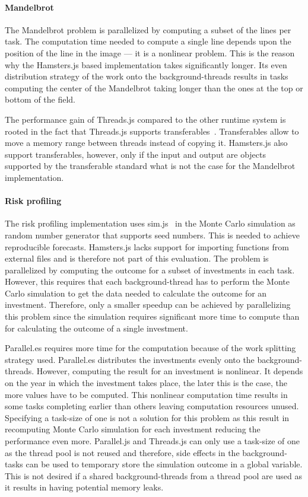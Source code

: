 \paragraph{Mandelbrot}
The Mandelbrot problem is parallelized by computing a subset of the lines per task. The computation time needed to compute a single line depends upon the position of the line in the image --- it is a nonlinear problem. This is the reason why the Hamsters.js based implementation takes significantly longer. Its even distribution strategy of the work onto the background-threads results in tasks computing the center of the Mandelbrot taking longer than the ones at the top or bottom of the field. 

The performance gain of Threads.js compared to the other runtime system is rooted in the fact that Threads.js supports transferables~\cite[Section 2.7.4]{w3cHtml5}. Transferables allow to move a memory range between threads instead of copying it. Hamsters.js also support transferables, however, only if the input and output are objects supported by the transferable standard what is not the case for the Mandelbrot implementation.

\paragraph{Risk profiling}
The risk profiling implementation uses sim.js~\cite{simjs} in the Monte Carlo simulation as random number generator that supports seed numbers. This is needed to achieve reproducible forecasts. Hamsters.js lacks support for importing functions from external files and is therefore not part of this evaluation. The problem is parallelized by computing the outcome for a subset of investments in each task. However, this requires that each background-thread has to perform the Monte Carlo simulation to get the data needed to calculate the outcome for an investment. Therefore, only a smaller speedup can be achieved by parallelizing this problem since the simulation requires significant more time to compute than for calculating the outcome of a single investment. 

Parallel.es requires more time for the computation because of the work splitting strategy used. Parallel.es distributes the investments evenly onto the background-threads. However, computing the result for an investment is nonlinear. It depends on the year in which the investment takes place, the later this is the case, the more values have to be computed. This nonlinear computation time results in some tasks completing earlier than others leaving computation resources unused. Specifying a task-size of one is not a solution for this problem as this result in recomputing Monte Carlo simulation for each investment reducing the performance even more. Parallel.js and Threads.js can only use a task-size of one as the thread pool is not reused and therefore, side effects in the background-tasks can be used to temporary store the simulation outcome in a global variable. This is not desired if a shared background-threads from a thread pool are used as it results in having potential memory leaks.

